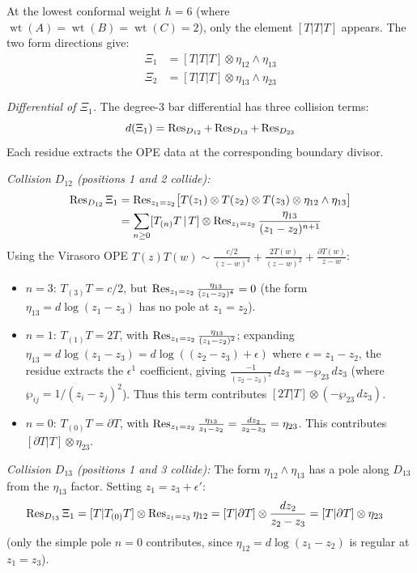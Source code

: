 \begin{computation}
\label{comp:w3-deg3-structure}

At the lowest conformal weight $h = 6$ (where
$\operatorname{wt}(A) = \operatorname{wt}(B) = \operatorname{wt}(C) = 2$),
only the element $[T|T|T]$ appears.  The two form directions give:
\begin{align}
\Xi_1 &= [T|T|T] \otimes \eta_{12} \wedge \eta_{13}
\label{eq:w3-deg3-xi1} \\
\Xi_2 &= [T|T|T] \otimes \eta_{13} \wedge \eta_{23}
\label{eq:w3-deg3-xi2}
\end{align}

\emph{Differential of $\Xi_1$.}
The degree-3 bar differential has three collision terms:
\[
d(\Xi_1) = \operatorname{Res}_{D_{12}} + \operatorname{Res}_{D_{13}} + \operatorname{Res}_{D_{23}}
\]
Each residue extracts the OPE data at the corresponding boundary divisor.

\emph{Collision $D_{12}$ (positions 1 and 2 collide):}
\begin{align*}
\operatorname{Res}_{D_{12}}\Xi_1
&= \operatorname{Res}_{z_1 = z_2}\bigl[T(z_1) \otimes T(z_2)
\otimes T(z_3) \otimes \eta_{12} \wedge \eta_{13}\bigr] \\
&= \sum_{n \geq 0} [T_{(n)}T \,|\, T] \otimes
\operatorname{Res}_{z_1 = z_2}\frac{\eta_{13}}{(z_1-z_2)^{n+1}}
\end{align*}
Using the Virasoro OPE
$T(z)T(w) \sim \frac{c/2}{(z-w)^4} + \frac{2T(w)}{(z-w)^2}
+ \frac{\partial T(w)}{z-w}$:
\begin{itemize}
\item $n = 3$: $T_{(3)}T = c/2$, but $\operatorname{Res}_{z_1=z_2}
\frac{\eta_{13}}{(z_1-z_2)^4} = 0$ (the form $\eta_{13}
= d\log(z_1-z_3)$ has no pole at $z_1 = z_2$).
\item $n = 1$: $T_{(1)}T = 2T$, with $\operatorname{Res}_{z_1=z_2}
\frac{\eta_{13}}{(z_1-z_2)^2}$; expanding
$\eta_{13} = d\log(z_1-z_3) = d\log((z_2-z_3)+\epsilon)$ where
$\epsilon = z_1-z_2$, the residue extracts the $\epsilon^1$
coefficient, giving $\frac{-1}{(z_2-z_3)^2}\,dz_3 = -\wp_{23}\,dz_3$
(where $\wp_{ij} = 1/(z_i-z_j)^2$).  Thus this term contributes
$[2T|T] \otimes (-\wp_{23}\,dz_3)$.
\item $n = 0$: $T_{(0)}T = \partial T$, with $\operatorname{Res}_{z_1=z_2}
\frac{\eta_{13}}{z_1-z_2} = \frac{dz_2}{z_2-z_3} = \eta_{23}$.
This contributes $[\partial T|T] \otimes \eta_{23}$.
\end{itemize}

\emph{Collision $D_{13}$ (positions 1 and 3 collide):}
The form $\eta_{12} \wedge \eta_{13}$ has a pole along $D_{13}$
from the $\eta_{13}$ factor.  Setting $z_1 = z_3 + \epsilon'$:
\begin{align*}
\operatorname{Res}_{D_{13}}\Xi_1
&= [T|T_{(0)}T] \otimes \operatorname{Res}_{z_1=z_3}\eta_{12}
= [T|\partial T] \otimes \frac{dz_2}{z_2-z_3}
= [T|\partial T] \otimes \eta_{23}
\end{align*}
(only the simple pole $n = 0$ contributes, since $\eta_{12}
= d\log(z_1-z_2)$ is regular at $z_1 = z_3$).


\end{computation}
